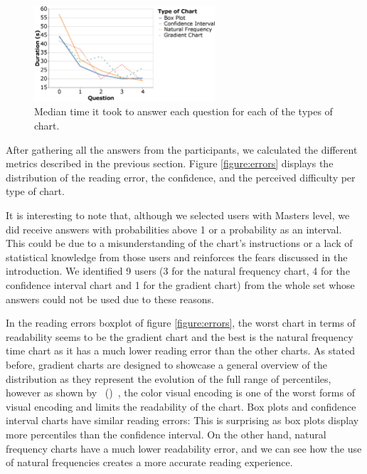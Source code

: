 \documentclass[a4paper,3p,sort&compress]{elsarticle}
\DeclareRobustCommand{\citeextp}[1]{\citeauthor{#1}~(\citeyear{#1})~\cite{#1}}
\begin{document}
\begin{figure}
  \centering
  \includegraphics[width=0.6\textwidth]{duration_evo2}
  \caption{\label{figure:duration} Median time it took to answer each question
    for each of the types of chart.}
\end{figure}

After gathering all the answers from the participants, we calculated the
different metrics described in the previous section. Figure \ref{figure:errors}
displays the distribution of the reading error, the confidence, and the
perceived difficulty per type of chart.

It is interesting to note that, although we selected users with Masters level,
we did receive answers with probabilities above 1 or a probability as an
interval. This could be due to a misunderstanding of the chart's instructions or
a lack of statistical knowledge from those users and reinforces the fears
discussed in the introduction. We identified 9 users (3 for the natural
frequency chart, 4 for the confidence interval chart and 1 for the gradient
chart) from the whole set whose answers could not be used due to these reasons.

In the reading errors boxplot of figure \ref{figure:errors}, the worst chart in
terms of readability seems to be the gradient chart and the best is the natural
frequency time chart as it has a much lower reading error than the other charts.
As stated before, gradient charts are designed to showcase a general overview of
the distribution as they represent the evolution of the full range of
percentiles, however as shown by \citeextp{cleveland_graphical_1984}, the
color visual encoding is one of the worst forms of visual encoding and
limits the readability of the chart. Box plots and confidence interval charts
have similar reading errors: This is surprising as box plots display more
percentiles than the confidence interval. On the other hand, natural frequency
charts have a much lower readability error, and we can see how the use of
natural frequencies creates a more accurate reading experience.
\end{document}
